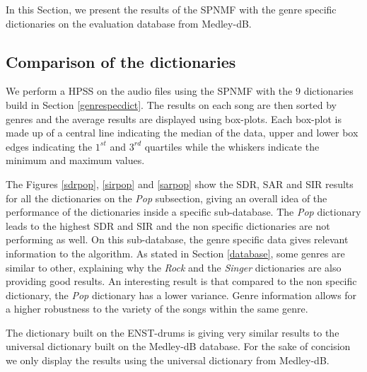 \documentclass{article}
\begin{document}
In this Section, we present the results of the SPNMF with the genre specific dictionaries on the evaluation database from Medley-dB.

\subsection{Comparison of the dictionaries}

We perform a HPSS on the audio files using the SPNMF with the $9$ dictionaries build in Section \ref{genrespecdict}. The results on each song are then sorted by genres and the average results are displayed using box-plots. Each box-plot is made up of a central line indicating the median of the data, upper and lower box edges indicating the $1^{st}$ and $3^{rd}$ quartiles while the whiskers indicate the minimum and maximum values. 


The Figures \ref{sdrpop}, \ref{sirpop} and \ref{sarpop} show the SDR, SAR and SIR results for all the dictionaries on the \emph{Pop} subsection, giving an overall idea of the performance of the dictionaries inside a specific sub-database. The \emph{Pop} dictionary leads to the highest SDR and SIR and the non specific dictionaries are not performing as well. On this sub-database, the genre specific data gives relevant information to the algorithm. As stated in Section \ref{database}, some genres are similar to other, explaining why the \emph{Rock} and the \emph{Singer} dictionaries are also providing good results. 
An interesting result is that compared to the non specific dictionary, the \emph{Pop} dictionary has a lower variance. Genre information allows for a higher robustness to the variety of the songs within the same genre.  

The dictionary built on the ENST-drums is giving very similar results to the universal dictionary built on the Medley-dB database. For the sake of concision we only display the results using the universal dictionary from Medley-dB. 
\end{document}
